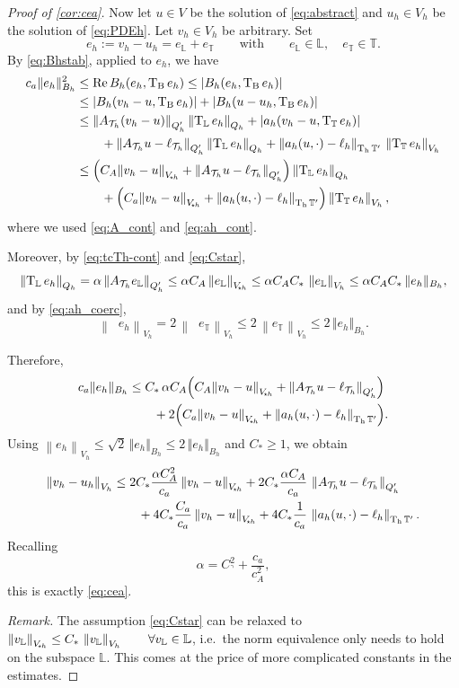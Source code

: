\documentclass[11pt]{article}
\theoremstyle{definition}
\theoremstyle{plain}
\newcommand{\Bhnorm}[1]{\Vert #1 \Vert_{B_h}}
\newcommand{\CA}{C_A}
\newcommand{\Ca}{C_a}
\newcommand{\ca}{c_a}
\newcommand{\cA}{c_A}
\newcommand{\CD}{C_*}
\newcommand{\CT}{C_\urcorner}
\newcommand{\Vsh}{V_{\!\star \hspace*{-0.2mm}h}}
\newcommand{\dgnorm}[1]{\norm{#1}_{V_h}}
\newcommand{\tdgnorm}[1]{{\Vert#1\Vert}_{\Vsh}}
\newcommand{\Th}{{\calT_h}}
\newcommand{\ILh}{\mathbb{L}}
\newcommand{\Qh}{Q_h}
\newcommand{\ATh}{A_{\Th}}
\newcommand{\Bh}{{B_h}}
\renewcommand{\Re}{\operatorname{Re}}
\DeclareMathOperator{\tcq}{T_\IL}
\DeclareMathOperator{\tct}{T_\IT}
\DeclareMathOperator{\tcb}{T_{B}}
\DeclareMathOperator{\tch}{T_h}
\newcommand*{\norm}[1]{\left\|#1\right\|}
\newcommand{\IL}{\mathbb{L}}
\newcommand{\IT}{\mathbb{T}}
\newcommand{\ITh}{\mathbb{T}}
\newcommand{\calT}{\mathcal{T}}
\begin{document}
\begin{proof}[Proof of \cref{cor:cea}]
Now let $u\in V$ be the solution of \eqref{eq:abstract} and $u_h\in V_h$ be the solution of \eqref{eq:PDEh}. Let $v_h\in V_h$ be arbitrary.
Set
\[
e_h:=v_h-u_h=e_\IL+e_\IT
\qquad\text{with}\qquad
e_\IL\in\ILh,\quad e_\IT\in\ITh.
\]
By \eqref{eq:Bhstab}, applied to $e_h$, we have
\begin{align*}
\ca \Bhnorm{e_h}^2
&\le \Re \Bh(e_h,\tcb e_h)
\le |\Bh(e_h,\tcb e_h)| \\
&\le |\Bh(v_h-u,\tcb e_h)| + |\Bh(u-u_h,\tcb e_h)| \\
&\le \norm{\ATh(v_h-u)}_{\Qh'}\norm{\tcq e_h}_{\Qh}
   + |a_h(v_h-u,\tct e_h)| \\
&\qquad
   + \norm{\ATh u-\ell_\Th}_{\Qh'}\norm{\tcq e_h}_{\Qh}
   + \norm{a_h(u,\cdot)-\ell_h}_{\tch\ITh'}\,\dgnorm{\tct e_h} \\
&\le \Bigl(\CA \tdgnorm{v_h-u} + \norm{\ATh u-\ell_\Th}_{\Qh'}\Bigr)\norm{\tcq e_h}_{\Qh} \\
&\qquad
   + \Bigl(\Ca \tdgnorm{v_h-u} + \norm{a_h(u,\cdot)-\ell_h}_{\tch\ITh'}\Bigr)\dgnorm{\tct e_h},
\end{align*}
where we used \eqref{eq:A_cont} and \eqref{eq:ah_cont}.

Moreover, by \eqref{eq:tcTh-cont} and \eqref{eq:Cstar},
\[
\norm{\tcq e_h}_{\Qh}
= \alpha \norm{\ATh e_\IL}_{\Qh'}
\le \alpha\CA\,\tdgnorm{e_\IL}
\le \alpha\CA\CD\,\dgnorm{e_\IL}
\le \alpha\CA\CD\,\Bhnorm{e_h},
\]
and by \eqref{eq:ah_coerc},
\[
\dgnorm{\tct e_h}
=2\,\dgnorm{\tch e_\IT}
\le 2\,\dgnorm{e_\IT}
\le 2\,\Bhnorm{e_h}.
\]

Therefore,
\begin{align*}
\ca \Bhnorm{e_h}
&\le
\CD\,\alpha\CA\Bigl(\CA \tdgnorm{v_h-u} + \norm{\ATh u-\ell_\Th}_{\Qh'}\Bigr) \\
&\qquad
+2\Bigl(\Ca \tdgnorm{v_h-u} + \norm{a_h(u,\cdot)-\ell_h}_{\tch\ITh'}\Bigr).
\end{align*}
Using $\dgnorm{e_h}\le \sqrt{2}\,\Bhnorm{e_h}\le 2\,\Bhnorm{e_h}$ and $\CD\ge 1$, we obtain
\begin{align*}
\dgnorm{v_h-u_h}
&\le
2\CD\frac{\alpha\CA^2}{\ca}\,\tdgnorm{v_h-u}
+2\CD\frac{\alpha\CA}{\ca}\,\norm{\ATh u-\ell_\Th}_{\Qh'}\\
&\qquad
+4\CD\frac{\Ca}{\ca}\,\tdgnorm{v_h-u}
+4\CD\frac{1}{\ca}\,\norm{a_h(u,\cdot)-\ell_h}_{\tch\ITh'}.
\end{align*}
Recalling
\[
\alpha=\CT^2+\frac{\ca}{\cA^2},
\]
this is exactly \eqref{eq:cea}.


\medskip
\noindent\emph{Remark.}
    The assumption \eqref{eq:Cstar} can be relaxed to $\tdgnorm{v_\IL}\le \CD\,\dgnorm{v_\IL}\qquad\forall v_\IL\in\ILh$, i.e.\ the norm equivalence only needs to hold on the subspace $\ILh$.
    This comes at the price of more complicated constants in the estimates.

\end{proof}
\end{document}

